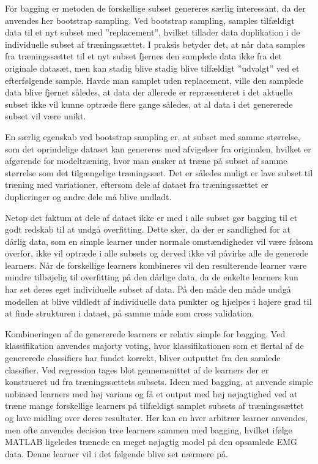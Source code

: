 For bagging er metoden de forskellige subset genereres særlig interessant, da der anvendes her bootstrap sampling.
Ved bootstrap sampling, samples tilfældigt data til et nyt subset med ”replacement”, hvilket tillader data duplikation i de individuelle subset af træningssættet. I praksis betyder det, at når data samples fra træningssættet til et nyt subset fjernes den samplede data ikke fra det originale datasæt, men kan stadig blive stadig blive tilfældigt ”udvalgt” ved et efterfølgende sample. Havde man samplet uden replacement, ville den samplede data blive fjernet således, at data der allerede er repræsenteret i det aktuelle subset ikke vil kunne optræde flere gange således, at al data i det genererede subset vil være unikt.

En særlig egenskab ved bootstrap sampling er, at subset med samme størrelse, som det oprindelige dataset kan genereres med afvigelser fra originalen, hvilket er afgørende for modeltræning, hvor man ønsker at træne på subset af samme størrelse som det tilgængelige træningssæt. Det er således muligt er lave subset til træning med variationer, eftersom dele af dataet fra træningssættet er duplieringer og andre dele må blive undladt. 

Netop det faktum at dele af dataet ikke er med i alle subset gør bagging til et godt redskab til at undgå overfitting. Dette sker, da der er sandlighed for at dårlig data, som en simple learner under normale omstændigheder vil være følsom overfor, ikke vil optræde i alle subsets og derved ikke vil påvirke alle de generede learners. Når de forskellige learners kombineres vil den resulterende learner være mindre tilbøjelig til overfitting på den dårlige data, da de enkelte learners kun har set deres eget individuelle subset af data. På den måde den måde undgå modellen at blive vildledt af individuelle data punkter og hjælpes i højere grad til at finde strukturen i dataet, på samme måde som cross validation.

Kombineringen af de genererede learners er relativ simple for bagging. Ved klassifikation anvendes majorty voting, hvor klassifikationen som et flertal af de genererede classifiers har fundet korrekt, bliver outputtet fra den samlede classifier.
Ved regression tages blot gennemsnittet af de learners der er konstrueret ud fra træningssættets subsets. Ideen med bagging, at anvende simple unbiased learners med høj varians og få et output med høj nøjagtighed ved at træne mange forskellige learners på tilfældigt samplet subsets af træningssættet og lave midling over deres resultater. Her kan en hver arbitrær learner anvendes, men ofte anvendes decision tree learners sammen med bagging, hvilket ifølge MATLAB ligeledes trænede en meget nøjagtig model på den opsamlede EMG data. Denne learner vil i det følgende blive set nærmere på.

